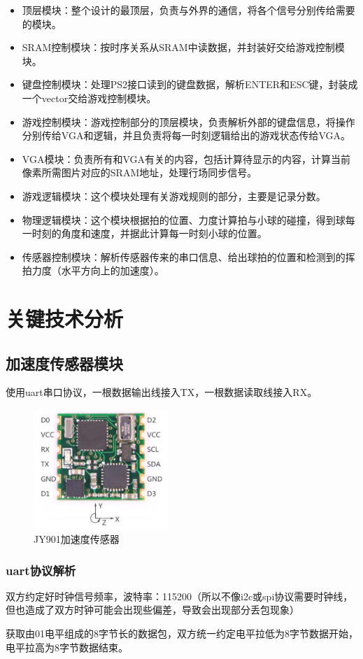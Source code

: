 \documentclass[UTF8]{article}
\begin{document}
\begin{itemize}
  \item 顶层模块：整个设计的最顶层，负责与外界的通信，将各个信号分别传给需要的模块。
  \item SRAM控制模块：按时序关系从SRAM中读数据，并封装好交给游戏控制模块。
  \item 键盘控制模块：处理PS2接口读到的键盘数据，解析ENTER和ESC键，封装成一个vector交给游戏控制模块。
  \item 游戏控制模块：游戏控制部分的顶层模块，负责解析外部的键盘信息，将操作分别传给VGA和逻辑，并且负责将每一时刻逻辑给出的游戏状态传给VGA。
  \item VGA模块：负责所有和VGA有关的内容，包括计算待显示的内容，计算当前像素所需图片对应的SRAM地址，处理行场同步信号。
  \item 游戏逻辑模块：这个模块处理有关游戏规则的部分，主要是记录分数。
  \item 物理逻辑模块：这个模块根据拍的位置、力度计算拍与小球的碰撞，得到球每一时刻的角度和速度，并据此计算每一时刻小球的位置。
  \item 传感器控制模块：解析传感器传来的串口信息、给出球拍的位置和检测到的挥拍力度（水平方向上的加速度）。
\end{itemize}

\section{关键技术分析}
\subsection{加速度传感器模块}
使用uart串口协议，一根数据输出线接入TX，一根数据读取线接入RX。
	\begin{figure}[H]
		\centering
		\includegraphics[width=2in]{2-1.png}
			\caption{JY901加速度传感器}	
	\end{figure}
\subsubsection{uart协议解析}
双方约定好时钟信号频率，波特率：115200（所以不像i2c或spi协议需要时钟线，但也造成了双方时钟可能会出现些偏差，导致会出现部分丢包现象）\par
获取由01电平组成的8字节长的数据包，双方统一约定电平拉低为8字节数据开始，电平拉高为8字节数据结束。\par
\end{document}
